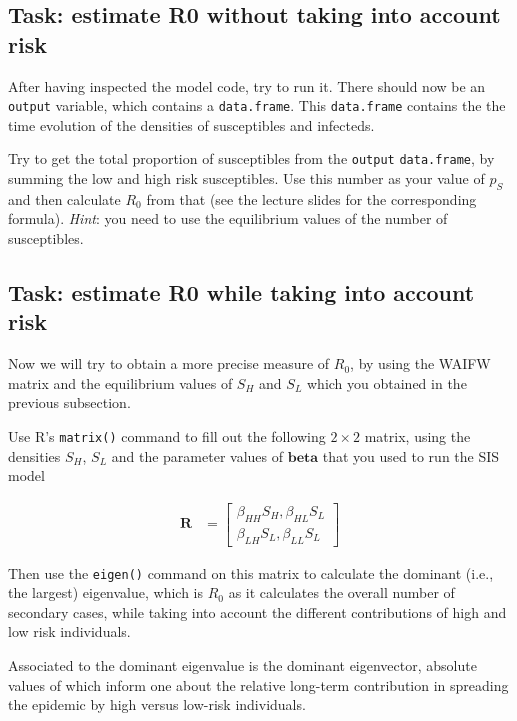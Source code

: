 \documentclass[
]{book}
\theoremstyle{definition}
\theoremstyle{definition}
\theoremstyle{definition}
\theoremstyle{definition}
\theoremstyle{remark}
\begin{document}
\subsection{Task: estimate R0 without taking into account risk}\label{task-estimate-r0-without-taking-into-account-risk}

After having inspected the model code, try to run it.
There should now be an \texttt{output} variable, which contains a \texttt{data.frame}. This \texttt{data.frame} contains the
the time evolution of the densities of susceptibles
and infecteds.

Try to get the total proportion of susceptibles from the \texttt{output} \texttt{data.frame}, by summing the low and high
risk susceptibles. Use this number as your value of
\(p_{S}\) and then calculate \(R_{0}\) from that (see
the lecture slides for the corresponding formula).
\emph{Hint}: you need to use the equilibrium values of the
number of susceptibles.

\subsection{Task: estimate R0 while taking into account risk}\label{task-estimate-r0-while-taking-into-account-risk}

Now we will try to obtain a more precise measure of
\(R_{0}\), by using the WAIFW matrix and the
equilibrium values of \(S_{H}\) and \(S_{L}\) which you obtained in the previous subsection.

Use R's \texttt{matrix()} command to fill out the following
\(2 \times 2\) matrix, using the densities \(S_{H}\), \(S_{L}\) and the parameter values of \(\mathbf{beta}\) that you used
to run the SIS model

\[\begin{aligned}
\mathbf{R} &= \left [ \begin{matrix} \beta_{HH} S_{H}, \beta_{HL} S_{L} \\
\beta_{LH} S_{L}, \beta_{LL} S_{L}
\end{matrix} \right ]
\end{aligned}\]

Then use the \texttt{eigen()} command on this matrix to calculate
the dominant (i.e., the largest) eigenvalue, which is \(R_{0}\) as it calculates the overall number of secondary
cases, while taking into account the different contributions of high and low risk individuals.

Associated to the dominant eigenvalue is the dominant eigenvector, absolute
values of which inform one about the relative long-term contribution in spreading the epidemic by high versus low-risk individuals.
\end{document}

